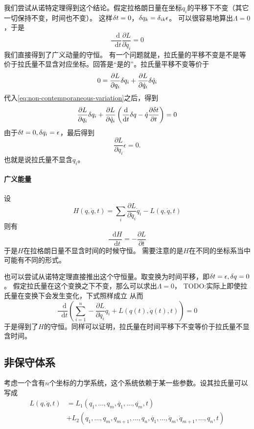 \documentclass[UTF8, a4paper]{ctexart}
\newcommand*{\diff}{\mathop{}\!\mathrm{d}}
\begin{document}
我们尝试从诺特定理得到这个结论。假定拉格朗日量在坐标$q_i$的平移下不变（其它一切保持不变，时间也不变）。
这样$\var t = 0$，$\var q_k = \var_{ik}\epsilon$。
可以很容易地算出$\Lambda = 0$，于是
\[
    \frac{\diff}{\diff t} \frac{\partial L}{\partial \dot{q}_i} = 0
\]
我们直接得到了广义动量的守恒。
有一个问题就是，拉氏量的平移不变是不是等价于拉氏量不显含对应坐标。回答是“是的”。拉氏量平移不变等价于
\[
    0 = \frac{\partial L}{\partial q_i} \var q_i + \frac{\partial L}{\partial \dot{q}_i} \var \dot{q}_i
\]
代入\eqref{eq:non-contemporaneous-variation}之后，得到
\[
    \frac{\partial L}{\partial q_i} \var q_i + 
    \frac{\partial L}{\partial \dot{q}_i} \left(\frac{\diff}{\diff t} \var q - \dot{q} \frac{\partial \var t}{\partial t}\right)
    = 0
\]
由于$\var t = 0, \var q_i = \epsilon$，最后得到
\[
    \frac{\partial L}{\partial q_i} \epsilon = 0.
\]
也就是说拉氏量不显含$q_i$。

\paragraph{广义能量} 设
\begin{equation}
    H(q, \dot{q}, t) = \sum_i \frac{\partial L}{\partial \dot{q}_i} \dot{q}_i - L(q, \dot{q}, t)
    \label{eq:generalized-energy}
\end{equation}
则有
\begin{equation}
    \frac{\diff H}{\diff t} = - \frac{\partial L}{\partial t}
    \label{eq:generalized-energy-evolution}
\end{equation}
于是$H$在拉格朗日量不显含时间的时候守恒。
需要注意的是$H$在不同的坐标系当中可能有不同的形式。

也可以尝试从诺特定理直接推出这个守恒量。取变换为时间平移，即$\var t = \epsilon, \var q = 0$。
假定拉氏量在这个变换之下不变，那么可以求出$\Lambda = 0$，
TODO:实际上即使拉氏量在变换下会发生变化，下式照样成立
从而
\[
    \frac{\diff}{\diff t} \left( \sum_{i=1}^n - \frac{\partial L}{\partial \dot{q}_i} \dot{q}_i + L(q(t), \dot{q}(t), t) \right) = 0
\]
于是得到了$H$的守恒。同样可以证明，拉氏量在时间平移下不变等价于拉氏量不显含时间。

\subsection{非保守体系}
\label{sec:non-conservative-system}

考虑一个含有$n$个坐标的力学系统，这个系统依赖于某一些参数。设其拉氏量可以写成
\[
    \begin{aligned}
        L(q, \dot{q}, t) &= L_1 (q_1, \ldots, q_m, \dot{q_1}, \ldots, \dot{q_m}, t) \\
        &+ L_2 (q_1, \ldots, q_m, q_{m+1}, \ldots, q_n, \dot{q_1}, \ldots, \dot{q}_m, \dot{q}_{m+1}, \ldots, q_n, t)
    \end{aligned}
\]
\end{document}
